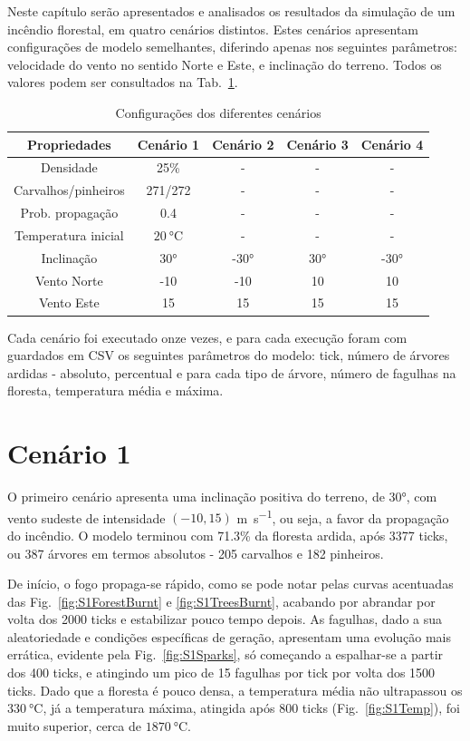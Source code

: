 Neste capítulo serão apresentados e analisados os resultados da simulação de um incêndio florestal, em quatro cenários distintos. Estes cenários apresentam configurações de modelo semelhantes, diferindo apenas nos seguintes parâmetros: velocidade do vento no sentido Norte e Este, e inclinação do terreno. Todos os valores podem ser consultados na Tab.~\ref{tab:scenarios}.

\begin{table}[tbhp]
    \centering
    \begin{tabular}{c|cccc} 
    \hline
    \textbf{Propriedades} & \textbf{Cenário 1} & \textbf{Cenário 2} & \textbf{Cenário 3} & \textbf{Cenário 4} \\ 
    \hline
    Densidade & 25\% & - & - & - \\
    Carvalhos/pinheiros & 271/272 & - & - & - \\
    Prob. propagação & 0.4 & - & - & - \\
    Temperatura inicial & $\SI{20}{\degreeCelsius}$ & - & - & - \\
    Inclinação & \ang{30} & \ang{-30} & \ang{30} & \ang{-30} \\
    Vento Norte & -10 & -10 & 10 & 10 \\
    Vento Este & 15 & 15 & 15 & 15 \\
    \hline
    \end{tabular}
    \caption{Configurações dos diferentes cenários}
    \label{tab:scenarios}
\end{table}

Cada cenário foi executado onze vezes, e para cada execução foram com guardados em CSV os seguintes parâmetros do modelo: tick, número de árvores ardidas - absoluto, percentual e para cada tipo de árvore, número de fagulhas na floresta, temperatura média e máxima.

\section{Cenário 1}\label{sec:scenario1}

O primeiro cenário apresenta uma inclinação positiva do terreno, de \ang{30}, com vento sudeste de intensidade $(-10, 15)$ \si{\meter\per\second}, ou seja, a favor da propagação do incêndio. O modelo terminou com 71.3\% da floresta ardida, após 3377 ticks, ou 387 árvores em termos absolutos - 205 carvalhos e 182 pinheiros.

De início, o fogo propaga-se rápido, como se pode notar pelas curvas acentuadas das Fig.~\ref{fig:S1ForestBurnt} e \ref{fig:S1TreesBurnt}, acabando por abrandar por volta dos 2000 ticks e estabilizar pouco tempo depois. As fagulhas, dado a sua aleatoriedade e condições específicas de geração, apresentam uma evolução mais errática, evidente pela Fig.~\ref{fig:S1Sparks}, só começando a espalhar-se a partir dos 400 ticks, e atingindo um pico de 15 fagulhas por tick por volta dos 1500 ticks. Dado que a floresta é pouco densa, a temperatura média não ultrapassou os $\SI{330}{\degreeCelsius}$, já a temperatura máxima, atingida após 800 ticks (Fig.~\ref{fig:S1Temp}), foi muito superior, cerca de $\SI{1870}{\degreeCelsius}$.
    
